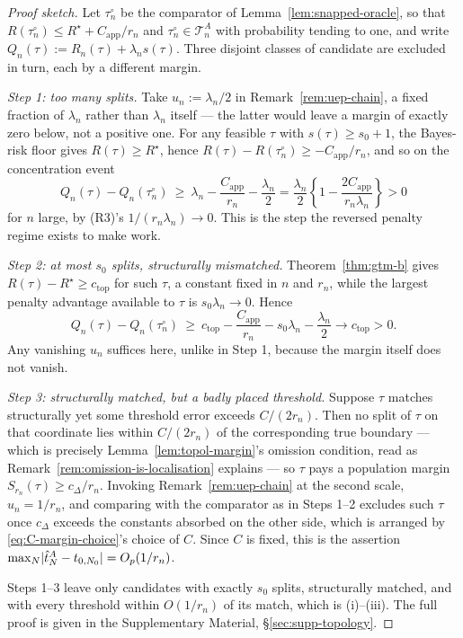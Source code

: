 \documentclass[11pt]{article}
\theoremstyle{plain}
\theoremstyle{definition}
\theoremstyle{remark}
\newcommand{\cT}{\mathcal{T}}
\DeclarePairedDelimiter{\abs}{\lvert}{\rvert}
\begin{document}
\begin{proof}[Proof sketch]
Let \(\tau_n^\circ\) be the comparator of Lemma~\ref{lem:snapped-oracle}, so
that \(R(\tau_n^\circ)\le R^\star+C_{\mathrm{app}}/r_n\) and
\(\tau_n^\circ\in\cT^A_n\) with probability tending to one, and write
\(Q_n(\tau):=R_n(\tau)+\lambda_ns(\tau)\). Three disjoint classes of candidate
are excluded in turn, each by a different margin.

\emph{Step 1: too many splits.} Take \(u_n:=\lambda_n/2\) in
Remark~\ref{rem:uep-chain}, a fixed fraction of \(\lambda_n\) rather than
\(\lambda_n\) itself --- the latter would leave a margin of exactly zero
below, not a positive one. For any feasible \(\tau\) with
\(s(\tau)\ge s_0+1\), the Bayes-risk floor gives \(R(\tau)\ge R^\star\), hence
\(R(\tau)-R(\tau_n^\circ)\ge-C_{\mathrm{app}}/r_n\), and so on the
concentration event
\[
  Q_n(\tau)-Q_n(\tau_n^\circ)
  \ \ge\
  \lambda_n-\frac{C_{\mathrm{app}}}{r_n}-\frac{\lambda_n}2
  =
  \frac{\lambda_n}2\left\{1-\frac{2C_{\mathrm{app}}}{r_n\lambda_n}\right\}
  >0
\]
for \(n\) large, by (R3)'s \(1/(r_n\lambda_n)\to0\). This is the step the
reversed penalty regime exists to make work.

\emph{Step 2: at most \(s_0\) splits, structurally mismatched.}
Theorem~\ref{thm:gtm-b} gives \(R(\tau)-R^\star\ge c_{\mathrm{top}}\) for
such \(\tau\), a constant fixed in \(n\) and \(r_n\), while the largest
penalty advantage available to \(\tau\) is \(s_0\lambda_n\to0\). Hence
\[
  Q_n(\tau)-Q_n(\tau_n^\circ)
  \ \ge\
  c_{\mathrm{top}}-\frac{C_{\mathrm{app}}}{r_n}-s_0\lambda_n
  -\frac{\lambda_n}2
  \longrightarrow c_{\mathrm{top}}>0 .
\]
Any vanishing \(u_n\) suffices here, unlike in Step 1, because the margin
itself does not vanish.

\emph{Step 3: structurally matched, but a badly placed threshold.} Suppose
\(\tau\) matches structurally yet some threshold error exceeds \(C/(2r_n)\).
Then no split of \(\tau\) on that coordinate lies within \(C/(2r_n)\) of the
corresponding true boundary --- which is precisely
Lemma~\ref{lem:topol-margin}'s omission condition, read as
Remark~\ref{rem:omission-is-localisation} explains --- so \(\tau\) pays a
population margin \(S_{r_n}(\tau)\ge c_\Delta/r_n\). Invoking
Remark~\ref{rem:uep-chain} at the second scale, \(u_n=1/r_n\), and comparing
with the comparator as in Steps 1--2 excludes such \(\tau\) once
\(c_\Delta\) exceeds the constants absorbed on the other side, which is
arranged by \eqref{eq:C-margin-choice}'s choice of \(C\). Since \(C\) is
fixed, this is the assertion \(\max_N\abs{\hat t^A_N-t_{0,N_0}}=O_p(1/r_n)\).

Steps 1--3 leave only candidates with exactly \(s_0\) splits, structurally
matched, and with every threshold within \(O(1/r_n)\) of its match, which is
(i)--(iii). The full proof is given in the Supplementary Material,
\S\ref{sec:supp-topology}.
\end{proof}
\end{document}
